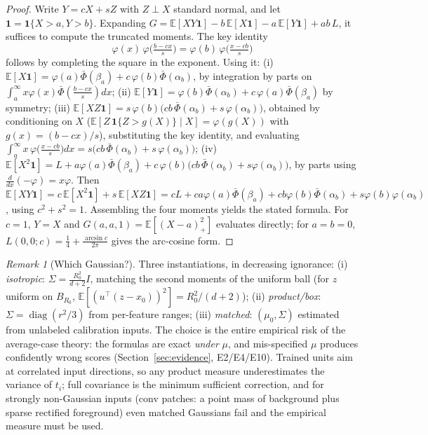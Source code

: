 \documentclass[11pt]{article}
\theoremstyle{remark}
\newtheorem{remark}[theorem]{Remark}
\newcommand{\E}{\mathbb{E}}
\DeclareMathOperator{\diag}{diag}
\begin{document}
\begin{proof}
Write $Y = cX + sZ$ with $Z \perp X$ standard normal, and let
$\mathbf 1 = \mathbf 1\{X>a, Y>b\}$. Expanding
$G = \E[XY\mathbf 1] - b\,\E[X\mathbf 1] - a\,\E[Y\mathbf 1] + ab\,L$, it
suffices to compute the truncated moments. The key identity
\[
  \varphi(x)\,\varphi\!\big(\tfrac{b - cx}{s}\big)
  = \varphi(b)\,\varphi\!\big(\tfrac{x - cb}{s}\big)
\]
follows by completing the square in the exponent. Using it:
(i) $\E[X\mathbf 1] = \varphi(a)\bar\Phi(\beta_a) +
c\,\varphi(b)\bar\Phi(\alpha_b)$, by integration by parts on
$\int_a^\infty x\varphi(x)\bar\Phi(\tfrac{b-cx}{s})dx$;
(ii) $\E[Y\mathbf 1] = \varphi(b)\bar\Phi(\alpha_b) +
c\,\varphi(a)\bar\Phi(\beta_a)$ by symmetry;
(iii) $\E[XZ\mathbf 1] = s\,\varphi(b)\big(cb\,\bar\Phi(\alpha_b) +
s\,\varphi(\alpha_b)\big)$, obtained by conditioning on $X$
($\E[Z\,\mathbf 1\{Z > g(X)\} \mid X] = \varphi(g(X))$ with
$g(x) = (b-cx)/s$), substituting the key identity, and evaluating
$\int_a^\infty x\,\varphi\big(\tfrac{x-cb}{s}\big)dx =
s\big(cb\,\bar\Phi(\alpha_b) + s\,\varphi(\alpha_b)\big)$;
(iv) $\E[X^2\mathbf 1] = L + a\varphi(a)\bar\Phi(\beta_a) +
c\,\varphi(b)\big(cb\,\bar\Phi(\alpha_b) + s\varphi(\alpha_b)\big)$, by parts
using $\tfrac{d}{dx}(-\varphi) = x\varphi$. Then
$\E[XY\mathbf 1] = c\,\E[X^2\mathbf 1] + s\,\E[XZ\mathbf 1]
= cL + ca\varphi(a)\bar\Phi(\beta_a) + cb\varphi(b)\bar\Phi(\alpha_b) +
s\varphi(b)\varphi(\alpha_b)$, using $c^2 + s^2 = 1$. Assembling the four
moments yields the stated formula. For $c=1$, $Y=X$ and
$G(a,a,1)=\E[(X-a)_+^2]$ evaluates directly; for $a=b=0$,
$L(0,0;c) = \tfrac14 + \tfrac{\arcsin c}{2\pi}$ gives the arc-cosine form.
\end{proof}

\begin{remark}[Which Gaussian?]\label{rem:measure}
Three instantiations, in decreasing ignorance:
(i) \emph{isotropic}: $\Sigma = \tfrac{R_0^2}{d+2} I$, matching the second
moments of the uniform ball (for $z$ uniform on $B_{R_0}$,
$\E[(u^\top(z-x_0))^2] = R_0^2/(d+2)$);
(ii) \emph{product/box}: $\Sigma = \diag(r^2/3)$ from per-feature ranges;
(iii) \emph{matched}: $(\mu_0,\Sigma)$ estimated from unlabeled calibration
inputs. The choice is the entire empirical risk of the average-case theory:
the formulas are exact \emph{under} $\mu$, and mis-specified $\mu$ produces
confidently wrong scores (Section~\ref{sec:evidence}, E2/E4/E10). Trained
units aim at correlated input directions, so any product measure
underestimates the variance of $t_i$; full covariance is the minimum
sufficient correction, and for strongly non-Gaussian inputs (conv patches:
a point mass of background plus sparse rectified foreground) even matched
Gaussians fail and the empirical measure must be used.
\end{remark}
\end{document}
